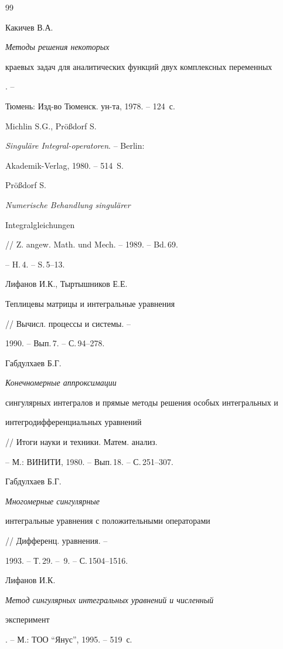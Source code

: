 \begin{thebibliography}{99}







Какичев В.А. {\it Методы решения некоторых


краевых задач для аналитических функций двух комплексных переменных}. --


Тюмень: Изд-во Тюменск. ун-та, 1978. -- 124~с.




Michlin S.G., Pr\"o\ss{}dorf S.


{\it Singul\"are Integral-operatoren}. -- Berlin:   %


Akademik-Verlag, 1980. -- 514~S.




Pr\"o\ss{}dorf S. {\it Numerische Behandlung singul\"arer


Integralgleichungen} // Z. angew. Math. und Mech. -- 1989. -- Bd.\,69.


-- H.\,4. -- S.\,5--13.




Лифанов И.К., Тыртышников Е.Е. {\it


Теплицевы матрицы и интегральные уравнения} // Вычисл. процессы и системы. --


1990. -- Вып.\,7. -- С.\,94--278.




Габдулхаев Б.Г. {\it Конечномерные аппроксимации


сингулярных интегралов и прямые методы решения особых интегральных и


интегродифференциальных уравнений} // Итоги науки и техники. Матем. анализ.


-- М.: ВИНИТИ, 1980. -- Вып.\,18. -- С.\,251--307.




Габдулхаев Б.Г. {\it Многомерные сингулярные


интегральные уравнения с положительными операторами} // Дифференц. уравнения. --


1993. -- Т.\,29. -- \No\,9. -- С.\,1504--1516.




Лифанов И.К. {\it Метод сингулярных интегральных уравнений и численный 


эксперимент}. -- М.: ТОО ``Янус'', 1995. -- 519~с.





\end{thebibliography}

